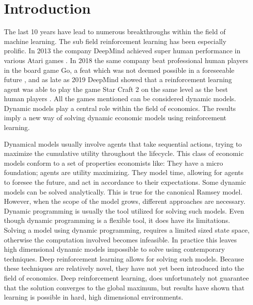 \section{Introduction} 

The last 10 years have lead to numerous breakthroughs within the field of machine learning. The sub field reinforcement learning has been especially prolific. In 2013 the company DeepMind achieved super human performance in various Atari games \parencite{mnih_playing_2013}. In 2018 the same company beat professional human players in the board game Go, a feat which was not deemed possible in a foreseeable future \parencite{silver_general_2018}, and as late as 2019 DeepMind showed that a reinforcement learning agent was able to play the game Star Craft 2 on the same level as the best human players \parencite{vinyals_grandmaster_2019}. All the games mentioned can be considered dynamic models. Dynamic models play a central role within the field of economics. The results imply a new way of solving dynamic economic models using reinforcement learning.

Dynamical models usually involve agents that take sequential actions, trying to maximize the cumulative utility throughout the lifecycle. This class of economic models conform to a set of properties economists like: They have a micro foundation; agents are utility maximizing. They model time, allowing for agents to foresee the future, and act in accordance to their expectations. Some dynamic models can be solved  analytically. This is true for the canonical Ramsey model. However, when the scope of the model grows, different approaches are necessary. Dynamic programming is usually the tool utilized for solving such models.  Even though dynamic programming is a flexible tool, it does have its limitations. Solving a model using dynamic programming, requires a limited sized state space, otherwise the computation involved becomes infeasible. In practice this leaves high dimensional dynamic models impossible to solve using contemporary techniques. Deep reinforcement learning allows for solving such models. Because these techniques are relatively novel, they have not yet been introduced into the field of economics. Deep reinforcement learning, does unfortunately not guarantee that the solution converges to the global maximum, but results have shown that learning is possible in hard, high dimensional environments.

